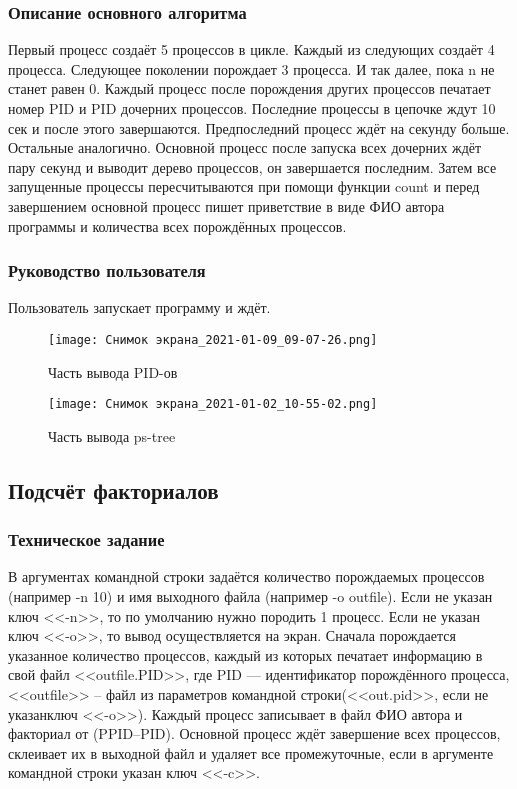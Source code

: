 \documentclass[a4paper,12pt]{extarticle}
\begin{document}
\subsubsection{Описание основного алгоритма}
Первый процесс создаёт 5 процессов в цикле. Каждый из следующих создаёт 4 процесса. Следующее поколении порождает 3 процесса. И так далее, пока n не станет равен 0. Каждый процесс после порождения других процессов печатает номер PID и PID дочерних процессов. Последние процессы в цепочке ждут 10 сек и после этого завершаются. Предпоследний процесс ждёт на секунду больше. Остальные аналогично. Основной  процесс после  запуска  всех дочерних ждёт пару секунд и выводит дерево  процессов, он завершается последним. Затем все запущенные  процессы пересчитываются при помощи функции count и перед завершением основной  процесс пишет приветствие  в  виде  ФИО автора программы и количества всех порождённых процессов.

\subsubsection{Руководство пользователя}
Пользователь запускает программу и ждёт.

\begin{figure}[h!]
\centering
\texttt{[image: Снимок экрана\_2021-01-09\_09-07-26.png]}
\caption{Часть вывода PID-ов} 
\label{fig:cube}
\end{figure}
\begin{figure}[h!]
\centering
\texttt{[image: Снимок экрана\_2021-01-02\_10-55-02.png]}
\caption{Часть вывода ps-tree}
\label{fig:cube}
\end{figure}


\newpage

\subsection{Подсчёт факториалов}
\subsubsection{Техническое задание}
В  аргументах  командной  строки  задаётся  количество  порождаемых процессов (например -n 10) и имя выходного файла (например -o outfile). Если не  указан  ключ <<-n>>,  то  по  умолчанию  нужно  породить  1  процесс.  Если  не указан ключ <<-o>>, то вывод осуществляется на экран. Сначала  порождается  указанное  количество  процессов,  каждый  из которых печатает информацию в   свой   файл <<outfile.PID>>, где PID --- идентификатор порождённого  процесса, <<outfile>> – файл  из  параметров командной  строки(<<out.pid>>,  если  не указанключ <<-o>>).  Каждый  процесс записывает  в  файл  ФИО  автора  и  факториал от (PPID–PID). Основной процесс  ждёт  завершение  всех  процессов,  склеивает  их  в  выходной  файл  и удаляет все промежуточные, если в аргументе командной строки указан ключ <<-c>>.
\end{document}
